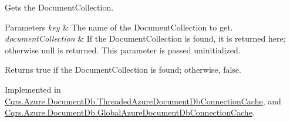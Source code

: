 Gets the Document\+Collection. 


\begin{DoxyParams}{Parameters}
{\em key} & The name of the Document\+Collection to get.\\
\hline
{\em document\+Collection} & If the Document\+Collection is found, it is returned here; otherwise null is returned. This parameter is passed uninitialized.\\
\hline
\end{DoxyParams}
\begin{DoxyReturn}{Returns}
true if the Document\+Collection is found; otherwise, false.
\end{DoxyReturn}


Implemented in \hyperlink{classCqrs_1_1Azure_1_1DocumentDb_1_1ThreadedAzureDocumentDbConnectionCache_a0986cecb40fc143751abb4605f507975_a0986cecb40fc143751abb4605f507975}{Cqrs.\+Azure.\+Document\+Db.\+Threaded\+Azure\+Document\+Db\+Connection\+Cache}, and \hyperlink{classCqrs_1_1Azure_1_1DocumentDb_1_1GlobalAzureDocumentDbConnectionCache_a9b178e41d62c9ebcfd8936418d5de009_a9b178e41d62c9ebcfd8936418d5de009}{Cqrs.\+Azure.\+Document\+Db.\+Global\+Azure\+Document\+Db\+Connection\+Cache}.

